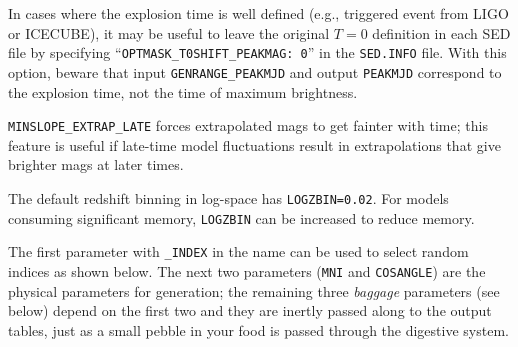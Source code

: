 \documentclass[12pt]{article}
\begin{document}
In cases where the explosion time is well defined 
(e.g., triggered event from LIGO or ICECUBE),
it may be useful to leave the original $T=0$ definition in each
SED file by specifying   ``{\tt OPTMASK\_T0SHIFT\_PEAKMAG: 0}'' 
in the {\tt SED.INFO} file.  With this option,
beware that input {\tt GENRANGE\_PEAKMJD} and output {\tt PEAKMJD} 
correspond to the explosion time, not the time of maximum brightness.

{\tt MINSLOPE\_EXTRAP\_LATE} forces extrapolated mags to get fainter
with time; this feature is useful if late-time model fluctuations
result in extrapolations that give brighter mags at later times.

The default redshift binning in log-space has {\tt LOGZBIN=0.02}.
For models consuming significant memory, {\tt LOGZBIN} can be
increased to reduce memory.

The first parameter with {\tt \_INDEX} in the name can be used
to select random indices as shown below.
The next two parameters ({\tt MNI} and {\tt COSANGLE})
are the physical parameters for generation; the remaining three
{\it baggage} parameters (see below) depend on the first two 
and they are inertly passed along to the output tables, 
just as a small pebble in your food is passed through 
the digestive system.
\end{document}
